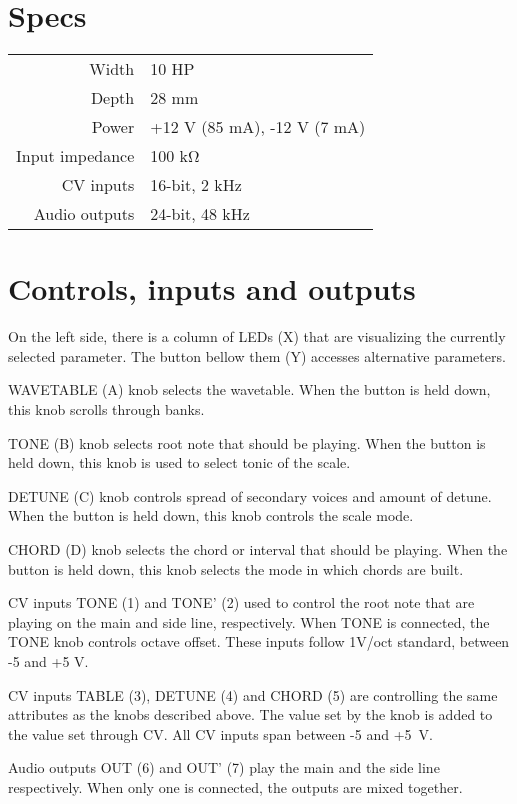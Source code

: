 \documentclass[10pt,nofoldmark,nocombine]{leaflet} %
\begin{document}
\section{Specs}

\begin{tabular}{@{}rl@{}}
  Width & 10 HP \\
  Depth & 28 mm \\
  Power & +12 V (85 mA), -12 V (7 mA) \\
  Input impedance & 100 kΩ \\
  CV inputs & 16-bit, 2 kHz \\
  Audio outputs & 24-bit, 48 kHz
\end{tabular}

\section{Controls, inputs and outputs}

On the left side, there is a column of LEDs (X) that are visualizing the currently selected parameter. The button bellow them (Y) accesses alternative parameters.

WAVETABLE (A) knob selects the wavetable. When the button is held down, this knob scrolls through banks.

TONE (B) knob selects root note that should be playing. When the button is held down, this knob is used to select tonic of the scale.

DETUNE (C) knob controls spread of secondary voices and amount of detune. When the button is held down, this knob controls the scale mode.

CHORD (D) knob selects the chord or interval that should be playing. When the button is held down, this knob selects the mode in which chords are built.

CV inputs TONE (1) and TONE' (2) used to control the root note that are playing on the main and side line, respectively. When TONE is connected, the TONE knob controls octave offset. These inputs follow 1V/oct standard, between -5 and +5 V.

CV inputs TABLE (3), DETUNE (4) and CHORD (5) are controlling the same attributes as the knobs described above. The value set by the knob is added to the value set through CV. All CV inputs span between -5 and +5~V.

Audio outputs OUT (6) and OUT' (7) play the main and the side line respectively. When only one is connected,
the outputs are mixed together.
\end{document}
